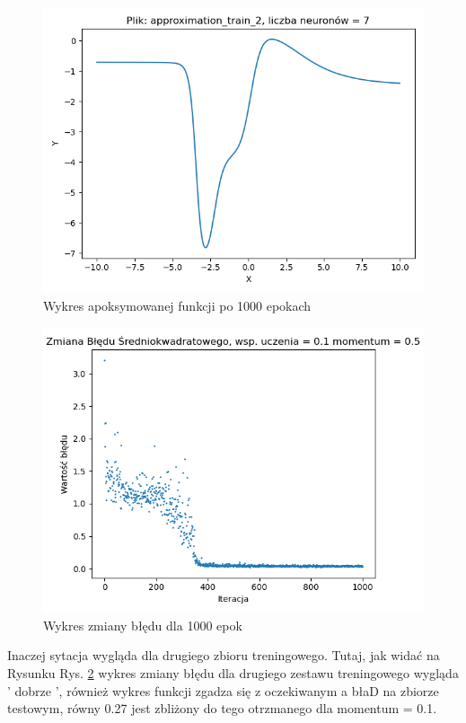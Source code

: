 \documentclass[12pt]{article}
\begin{document}
\begin{figure}[!htb]
 \centering
 \includegraphics[width=12cm]{FunctionPlot7Neuronmomentum05DWA.png}
 \caption{Wykres apoksymowanej funkcji po 1000 epokach}
 \vspace{-0.3cm}
 \label{WykresFun11}
\end{figure}

\begin{figure}[!htb]
 \centering
 \includegraphics[width=12cm]{ZmianaBledu7Neuronmomentum05DWA.png}
 \vspace{-0.3cm}
 \caption{Wykres zmiany błędu dla 1000 epok}
 \label{WykresBlad11}
\end{figure}

\newpage

Inaczej sytacja wygląda dla drugiego zbioru treningowego. Tutaj, jak widać na Rysunku Rys. \ref{WykresBlad11} wykres zmiany błędu dla drugiego zestawu treningowego wygląda ' dobrze ', również wykres funkcji zgadza się z oczekiwanym a błaD na zbiorze testowym, równy 0.27 jest zbliżony do tego otrzmanego dla momentum = 0.1.
\end{document}
